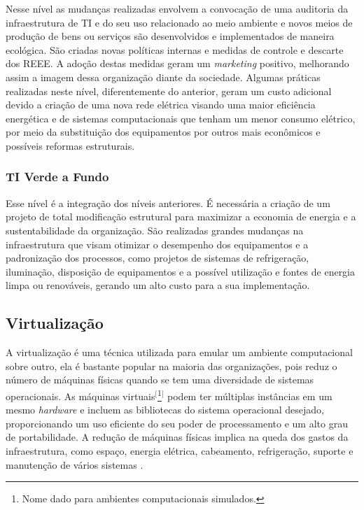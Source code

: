 Nesse nível as mudanças realizadas envolvem a convocação de uma auditoria da infraestrutura de TI e do seu uso relacionado ao meio ambiente e novos meios de produção de bens ou serviços são desenvolvidos e implementados de maneira ecológica. São criadas novas políticas internas e medidas de controle e descarte dos REEE. A adoção destas medidas geram um \textit{marketing} positivo, melhorando assim a imagem dessa organização diante da sociedade. Algumas práticas realizadas neste nível, diferentemente do anterior, geram um custo adicional devido a criação de uma nova rede elétrica visando uma maior eficiência energética e de sistemas computacionais que tenham um menor consumo elétrico, por meio da substituição dos equipamentos por outros mais econômicos e possíveis reformas estruturais.

\subsubsection{TI Verde a Fundo}

Esse nível é a integração dos níveis anteriores. É necessária a criação de um projeto de total modificação estrutural para maximizar a economia de energia e a sustentabilidade da organização. São realizadas grandes mudanças na infraestrutura que visam otimizar o desempenho dos equipamentos e a padronização dos processos, como projetos de sistemas de refrigeração, iluminação, disposição de equipamentos e a possível utilização e fontes de energia limpa ou renováveis, gerando um alto custo para a sua implementação.

\subsection{Virtualização}

A virtualização é uma técnica utilizada para emular um ambiente computacional sobre outro, ela é bastante popular na maioria das organizações, pois reduz o número de máquinas físicas quando se tem uma diversidade de sistemas operacionais. As máquinas virtuais$^{[}$\footnote{Nome dado para ambientes computacionais simulados.}$^{]}$ podem ter múltiplas instâncias em um mesmo \textit{hardware} e incluem as bibliotecas do sistema operacional desejado, proporcionando um uso eficiente do seu poder de processamento e um alto grau de portabilidade. A redução de máquinas físicas implica na queda dos gastos da infraestrutura, como espaço, energia elétrica, cabeamento, refrigeração, suporte e manutenção de vários sistemas \cite[p. 174-175]{carissimi2008virtualizaccao}.

